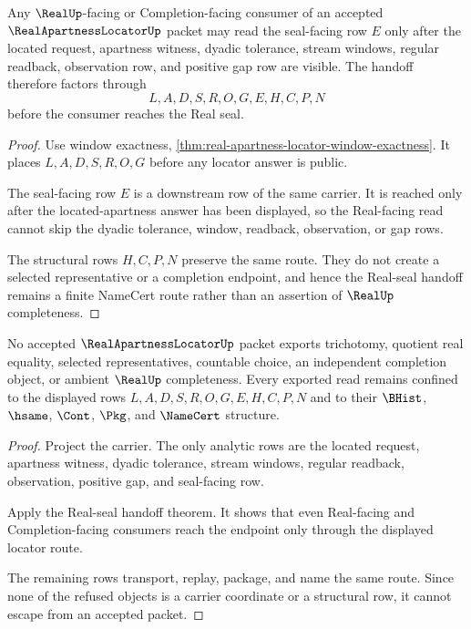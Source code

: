 \begin{theorem}
\label{thm:real-apartness-locator-real-seal-handoff}
Any $\RealUp$-facing or Completion-facing consumer of an accepted $\RealApartnessLocatorUp$ packet may read the seal-facing row $E$ only after the located request, apartness witness, dyadic tolerance, stream windows, regular readback, observation row, and positive gap row are visible. The handoff therefore factors through
$$
L,A,D,S,R,O,G,E,H,C,P,N
$$
before the consumer reaches the Real seal.
\end{theorem}
\begin{proof}
Use window exactness, \autoref{thm:real-apartness-locator-window-exactness}. It places $L,A,D,S,R,O,G$ before any locator answer is public.

The seal-facing row $E$ is a downstream row of the same carrier. It is reached only after the located-apartness answer has been displayed, so the Real-facing read cannot skip the dyadic tolerance, window, readback, observation, or gap rows.

The structural rows $H,C,P,N$ preserve the same route. They do not create a selected representative or a completion endpoint, and hence the Real-seal handoff remains a finite NameCert route rather than an assertion of $\RealUp$ completeness.
\end{proof}

\begin{theorem}
\label{thm:real-apartness-locator-nonescape}
No accepted $\RealApartnessLocatorUp$ packet exports trichotomy, quotient real equality, selected representatives, countable choice, an independent completion object, or ambient $\RealUp$ completeness. Every exported read remains confined to the displayed rows $L,A,D,S,R,O,G,E,H,C,P,N$ and to their $\BHist$, $\hsame$, $\Cont$, $\Pkg$, and $\NameCert$ structure.
\end{theorem}
\begin{proof}
Project the carrier. The only analytic rows are the located request, apartness witness, dyadic tolerance, stream windows, regular readback, observation, positive gap, and seal-facing row.

Apply the Real-seal handoff theorem. It shows that even Real-facing and Completion-facing consumers reach the endpoint only through the displayed locator route.

The remaining rows transport, replay, package, and name the same route. Since none of the refused objects is a carrier coordinate or a structural row, it cannot escape from an accepted packet.
\end{proof}

